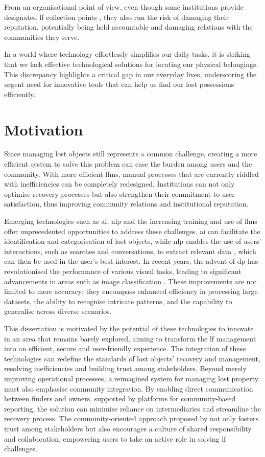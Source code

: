 From an organisational point of view, even though some institutions provide designated \ac{lf} collection points \cite{Tan2023}, they also run the risk of damaging their reputation, potentially being held accountable and damaging relations with the communities they serve.

In a world where technology effortlessly simplifies our daily tasks, it is striking that we lack effective technological solutions for locating our physical belongings. This discrepancy highlights a critical gap in our everyday lives, underscoring the urgent need for innovative tools that can help us find our lost possessions efficiently.

\section{Motivation} \label{section:motivation}

Since managing lost objects still represents a common challenge, creating a more efficient system to solve this problem can ease the burden among users and the community. With more efficient \ac{lfms}, manual processes that are currently riddled with inefficiencies can be completely redesigned. Institutions can not only optimise recovery processes but also strengthen their commitment to user satisfaction, thus improving community relations and institutional reputation.

Emerging technologies such as \ac{ai}, \ac{nlp} and the increasing training and use of \acp{llm} offer unprecedented opportunities to address these challenges. \ac{ai} can facilitate the identification and categorisation of lost objects, while \ac{nlp} enables the use of users' interactions, such as searches and conversations, to extract relevant data \cite{Prawira2024}, which can then be used in the user's best interest. In recent years, the advent of \ac{dp} has revolutionised the performance of various visual tasks, leading to significant advancements in areas such as image classification \cite{Liu2022}. These improvements are not limited to mere accuracy; they encompass enhanced efficiency in processing large datasets, the ability to recognise intricate patterns, and the capability to generalise across diverse scenarios.

This dissertation is motivated by the potential of these technologies to innovate in an area that remains barely explored, aiming to transform the \ac{lf} management into an efficient, secure and user-friendly experience. The integration of these technologies can redefine the standards of lost objects' recovery and management, resolving inefficiencies and building trust among stakeholders. Beyond merely improving operational processes, a reimagined system for managing lost property must also emphasise community integration. By enabling direct communication between finders and owners, supported by platforms for community-based reporting, the solution can minimise reliance on intermediaries and streamline the recovery process. The community-oriented approach proposed by  not only fosters trust among stakeholders but also encourages a culture of shared responsibility and collaboration, empowering users to take an active role in solving \ac{lf} challenges.

